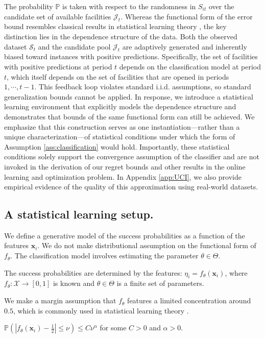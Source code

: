 \documentclass[nonblindrev]{informs3noheader}
\def\P{\mathbb{P}}
\def\calJ{\mathcal{J}}
\def\calS{\mathcal{S}}
\def\calX{\mathcal{X}}
\def\bx{\boldsymbol{x}}
\begin{document}
The probability $\P$ is taken with respect to the randomness in $S_{it}$ over the candidate set of available facilities $\calJ_t$. Whereas the functional form of the error bound resembles classical results in statistical learning theory \citep{boucheron2005theory, vapnik2015uniform, bousquet2002stability, feldman2019high}, the key distinction lies in the dependence structure of the data. Both the observed dataset $\calS_t$ and the candidate pool $\calJ_t$ are adaptively generated and inherently biased toward instances with positive predictions. Specifically, the set of facilities with positive predictions at period $t$ depends on the classification model at period $t$, which itself depends on the set of facilities that are opened in periods $1,\cdots,t-1$. This feedback loop violates standard i.i.d. assumptions, so standard generalization bounds cannot be applied. In response, we introduce a statistical learning environment that explicitly models the dependence structure and demonstrates that bounds of the same functional form can still be achieved. We emphasize that this construction serves as one instantiation—rather than a unique characterization—of statistical conditions under which the form of Assumption \ref{ass:classification} would hold. Importantly, these statistical conditions solely support the convergence assumption of the classifier and are not invoked in the derivation of our regret bounds and other results in the online learning and optimization problem. In Appendix \ref{app:UCI}, we also provide empirical evidence of the quality of this approximation using real-world datasets.

\subsection{A statistical learning setup.}
\label{subsec:setup}

We define a generative model of the success probabilities as a function of the features $\bx_{i}$. We do not make distributional assumption on the functional form of $f_\theta$. The classification model involves estimating the parameter $\theta\in\Theta$.
\begin{stat}\label{ass:known}
The success probabilities are determined by the features: $\eta_{i} = f_\theta(\bx_{i})$, where $f_\theta:\calX\to[0,1]$ is known and $\theta\in\Theta$ is a finite set of parameters. 
\end{stat}

We make a margin assumption that $f_\theta$ features a limited concentration around $0.5$, which is commonly used in statistical learning theory \citep[e.g.,][]{boucheron2005theory, tsybakov2004optimal}.
\begin{stat}[Margin]\label{ass:margin}
$\P\left(\left|f_\theta(\bx_{i})-\frac{1}{2}\right|\leq\nu\right)\leq C \nu^{\alpha}$ for some $C>0$ and $\alpha>0$.
\end{stat}
\end{document}
